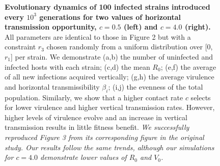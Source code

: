 \begin{figure}[tbp]
    \medskip
    \hfil

    \medskip
    \hfil
\caption{\textbf{Evolutionary dynamics of 100 infected strains introduced every
$10^3$ generations for two values of horizontal transmission opportunity,
$c = 0.5$ (left) and $c = 4.0$ (right).} All parameters are identical to those
in Figure 2 but with a constraint $r_3$ chosen randomly from a uniform
distribution over [0, $r_1$] per strain. We demonstrate (a,b) the number of
uninfected and infected hosts with each strain; (c,d) the mean $R_0$; (e,f) the
average of all new infections acquired vertically; (g,h) the average virulence
and horizontal transmissibility $\beta_i$; (i,j) the evenness of the total
population. Similarly, we show that a higher contact rate $c$ selects for lower
virulence and higher vertical transmission rates. However, higher levels of
virulence evolve and an increase in vertical transmission results in little
fitness benefit. \textit{We successfully reproduced Figure 3 from its
corresponding figure in the original study. Our results follow the same trends,
although our simulations for $c = 4.0$ demonstrate lower values of $R_0$ and
$V_0$.}
}
\label{fig:figure3}
\end{figure}

